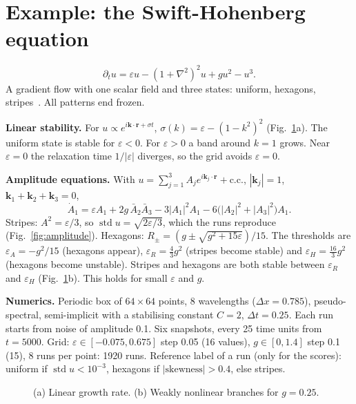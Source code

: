 \documentclass[11pt,a4paper]{article}
\DeclareMathOperator{\std}{std}
\begin{document}
\section{Example: the Swift-Hohenberg equation}\label{sec:demo}

\begin{tech}
\[
\partial_tu=\varepsilon u-(1+\nabla^2)^2u+gu^2-u^3 .
\]
A gradient flow with one scalar field and three states: uniform, hexagons, stripes~\cite{swift1977,cross1993,hoyle2006}.
All patterns end frozen.

\textbf{Linear stability.} For $u\propto e^{i\mathbf k\cdot\mathbf r+\sigma t}$, $\sigma(k)=\varepsilon-(1-k^2)^2$
(Fig.~\ref{fig:sh}a). The uniform state is stable for $\varepsilon<0$. For $\varepsilon>0$ a band around $k=1$
grows. Near $\varepsilon=0$ the relaxation time $1/|\varepsilon|$ diverges, so the grid avoids $\varepsilon=0$.

\textbf{Amplitude equations.} With $u=\sum_{j=1}^3A_je^{i\mathbf k_j\cdot\mathbf r}+\text{c.c.}$, $|\mathbf k_j|=1$,
$\mathbf k_1+\mathbf k_2+\mathbf k_3=0$,
\[
\dot A_1=\varepsilon A_1+2g\,\bar A_2\bar A_3-3|A_1|^2A_1-6\big(|A_2|^2+|A_3|^2\big)A_1 .
\]
Stripes: $A^2=\varepsilon/3$, so $\std u=\sqrt{2\varepsilon/3}$, which the runs reproduce (Fig.~\ref{fig:amplitude}).
Hexagons: $R_\pm=(g\pm\sqrt{g^2+15\varepsilon})/15$. The thresholds are $\varepsilon_A=-g^2/15$ (hexagons appear),
$\varepsilon_R=\tfrac43g^2$ (stripes become stable) and $\varepsilon_H=\tfrac{16}3g^2$ (hexagons become unstable).
Stripes and hexagons are both stable between $\varepsilon_R$ and $\varepsilon_H$ (Fig.~\ref{fig:sh}b). This holds
for small $\varepsilon$ and $g$.

\textbf{Numerics.} Periodic box of $64\times64$ points, 8 wavelengths ($\Delta x=0.785$), pseudo-spectral,
semi-implicit with a stabilising constant $C=2$, $\Delta t=0.25$. Each run starts from noise of amplitude 0.1. Six
snapshots, every 25 time units from $t=5000$. Grid: $\varepsilon\in[-0.075,0.675]$ step 0.05 (16 values),
$g\in[0,1.4]$ step 0.1 (15), 8 runs per point: 1920 runs. Reference label of a run (only for the scores): uniform if
$\std u<10^{-3}$, hexagons if $|\text{skewness}|>0.4$, else stripes.
\end{tech}

\begin{figure}[H]
\centering

\caption{(a) Linear growth rate. (b) Weakly nonlinear branches for $g=0.25$.}\label{fig:sh}
\end{figure}
\end{document}
